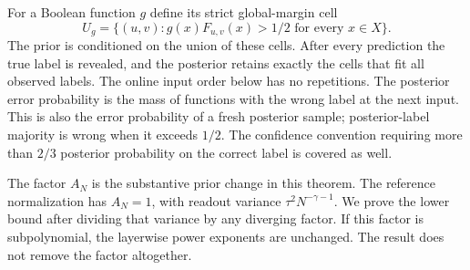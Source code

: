 \documentclass[11pt]{article}
\begin{document}
For a Boolean function $g$ define its strict global-margin cell
\begin{equation}\label{eq:cell}
 U_g=\{(u,v):g(x)F_{u,v}(x)>1/2\text{ for every }x\in X\}.
\end{equation}
The prior is conditioned on the union of these cells. After every
prediction the true label is revealed, and the posterior retains exactly
the cells that fit all observed labels. The online input order below has no repetitions.
The posterior error probability is the mass of functions with the wrong
label at the next input. This is also the error probability of a fresh
posterior sample; posterior-label majority is wrong when it exceeds
$1/2$. The confidence convention requiring more than $2/3$ posterior
probability on the correct label is covered as well.

The factor $A_N$ is the substantive prior change in this theorem.
The reference normalization has $A_N=1$, with readout variance
$\tau^2N^{-\gamma-1}$. We prove the lower bound after dividing that
variance by any diverging factor. If this factor is subpolynomial,
the layerwise power exponents are unchanged. The result does not remove
the factor altogether.
\end{document}
